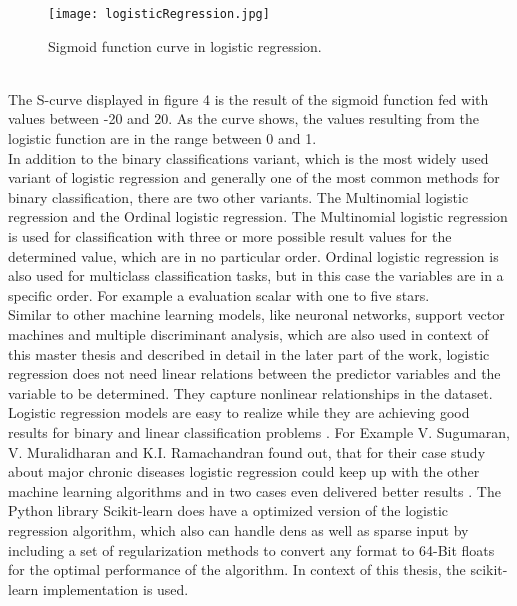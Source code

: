 \documentclass[../masterarbeit.tex]{subfiles}
\begin{document}
\begin{figure}[h]
    \centering
    \texttt{[image: logisticRegression.jpg]}
    \caption{Sigmoid function curve in logistic regression.}
\end{figure} \\
The S-curve displayed in figure 4 is the result of the sigmoid function fed with values between -20 and 20. As the curve shows, the values resulting from the logistic function are in the range between 0 and 1.\\
In addition to the binary classifications variant, which is the most widely used variant of logistic regression and generally one of the most common methods for binary classification, there are two other variants. The Multinomial logistic regression and the Ordinal logistic regression. The Multinomial logistic regression is used for classification with three or more possible result values for the determined value, which are in no particular order. Ordinal logistic regression is also used for multiclass classification tasks, but in this case the variables are in a specific order. For example a evaluation scalar with one to five stars. \autocite[]{ibm-logistic-regression:2022} \textcite[]{SUBASI202091} \\
Similar to other machine learning models, like neuronal networks, support vector machines and multiple discriminant analysis, which are also used in context of this master thesis and described in detail in the later part of the work, logistic regression does not need linear relations between the predictor variables and the variable to be determined. They capture nonlinear relationships in the dataset. \autocite[]{NUSINOVICI202056} \textcite[]{BELYADI2021169} \\
Logistic regression models are easy to realize while they are achieving good results for binary and linear classification problems \textcite[]{SUBASI202091}. For Example V. Sugumaran, V. Muralidharan and K.I. Ramachandran found out, that for their case study about major chronic diseases logistic regression could keep up with the other machine learning algorithms and in two cases even delivered better results \textcite[]{NUSINOVICI202056}.
The Python library Scikit-learn does have a optimized version of the logistic regression algorithm, which also can handle dens as well as sparse input by including a set of regularization methods to convert any format to 64-Bit floats for the optimal performance of the algorithm\textcite[]{Scikit-learn-logistic-regression:2022}. In context of this thesis, the scikit-learn implementation is used.
\end{document}
